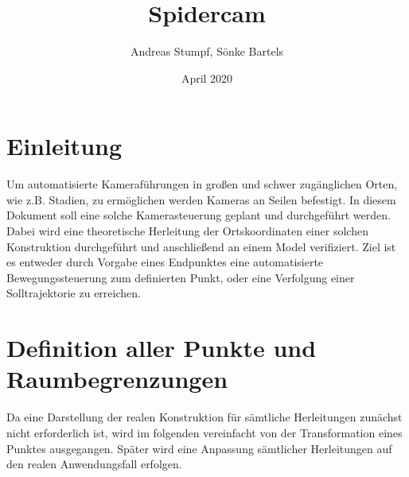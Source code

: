 \documentclass[a4paper, 12pt]{article}
\title{Spidercam}
\date{April 2020}
\author{Andreas Stumpf, Sönke Bartels}
\begin{document}
	\maketitle
	\newpage
	\tableofcontents
	\listoffigures
	\pagebreak
	\section{Einleitung}
		Um automatisierte Kameraführungen in großen und schwer zugänglichen Orten, wie z.B. Stadien, zu ermöglichen werden Kameras an Seilen befestigt.
		In diesem Dokument soll eine solche Kamerasteuerung geplant und durchgeführt werden.
		Dabei wird eine theoretische Herleitung der Ortskoordinaten einer solchen Konstruktion durchgeführt und anschließend an einem Model verifiziert.
		Ziel ist es entweder durch Vorgabe eines Endpunktes eine automatisierte Bewegungssteuerung zum definierten Punkt, oder eine Verfolgung einer Solltrajektorie zu erreichen. 
	\section{Definition aller Punkte und Raumbegrenzungen}
		Da eine Darstellung der realen Konstruktion für sämtliche Herleitungen zunächst nicht erforderlich ist, wird im folgenden vereinfacht von der Transformation eines Punktes ausgegangen. Später wird eine Anpassung sämtlicher Herleitungen auf den realen Anwendungsfall erfolgen.
		\pagebreak
\end{document}
